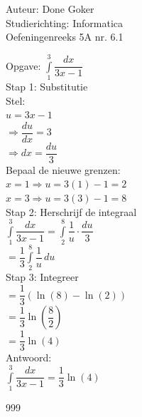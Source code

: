 \documentclass[a4paper]{article}
\begin{document}
  
\noindent \large Auteur: Done Goker \\
\noindent \large Studierichting: Informatica\\
\noindent \large Oefeningenreeks 5A nr. 6.1\\

\medskip

\normalsize

Opgave: $\displaystyle\int\limits_1^3 \dfrac{dx}{3x - 1}$ \\

Stap 1: Substitutie \\

Stel: \\

$u = 3x - 1$ \\

$\Rightarrow \dfrac{du}{dx} = 3$ \\

$\Rightarrow dx = \dfrac{du}{3}$ \\

Bepaal de nieuwe grenzen: \\

$x = 1 \Rightarrow u = 3(1) - 1 = 2$ \\

$x = 3 \Rightarrow u = 3(3) - 1 = 8$ \\

Stap 2: Herschrijf de integraal \\

$\displaystyle\int\limits_1^3 \dfrac{dx}{3x - 1}
= \displaystyle\int\limits_2^8 \dfrac{1}{u} \cdot \dfrac{du}{3}$ \\

$= \dfrac{1}{3} \displaystyle\int\limits_2^8 \dfrac{1}{u} \, du$ \\

Stap 3: Integreer \\

$= \dfrac{1}{3} \left( \ln(8) - \ln(2) \right)$ \\

$= \dfrac{1}{3} \ln\left( \dfrac{8}{2} \right)$ \\

$= \dfrac{1}{3} \ln(4)$ \\

Antwoord: \\

$\displaystyle\int\limits_1^3 \dfrac{dx}{3x - 1} = \dfrac{1}{3} \ln(4)$ \\

\begin{thebibliography}{999}
\end{thebibliography}
\end{document}
